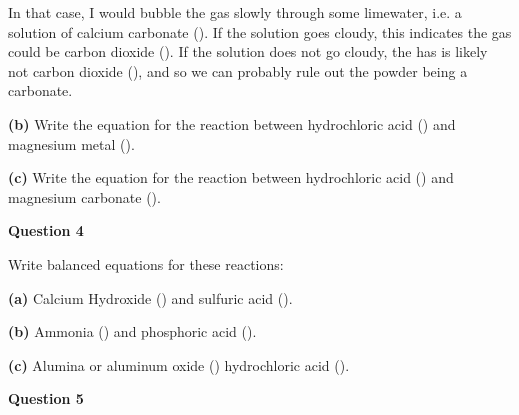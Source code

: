 \documentclass{article}
\begin{document}
{{In that case, I would bubble the gas slowly through some limewater, i.e. a solution of calcium carbonate (). If the solution goes cloudy, this indicates the gas could be carbon dioxide ().  If the solution does not go cloudy, the has is likely not carbon dioxide (), and so we can probably rule out the powder being a carbonate.
}
\vspace{0.2cm}

\textbf{(b)} Write the equation for the reaction between hydrochloric acid () and magnesium metal ().

{\color{red}
\begin{center}
\end{center}
}


\textbf{(c)} Write the equation for the reaction between hydrochloric acid () and magnesium carbonate ().

{\color{red}
\begin{center}
\end{center}
}

\pagebreak
\vspace{0.2cm}
\hspace{1cm}
\textbf{Question 4} 
\vspace{0.2cm}

Write balanced equations for these reactions:
\vspace{0.2cm}

\textbf{(a)} Calcium Hydroxide () and sulfuric acid ().

{\color{red}
\begin{center}
\end{center}
}

\textbf{(b)} Ammonia () and phosphoric acid ().

{\color{red}
\begin{center}
\end{center}
}

\textbf{(c)} Alumina or aluminum oxide () hydrochloric acid ().

{\color{red}
\begin{center}
\end{center}
}

\pagebreak
\vspace{0.2cm}
\hspace{1cm}
\textbf{Question 5} 
\vspace{0.2cm}

}
\end{document}
